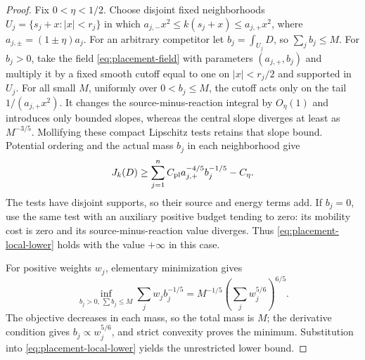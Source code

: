 \begin{proof}
Fix $0<\eta<1/2$. Choose disjoint fixed neighborhoods
$U_j=\{s_j+x:|x|<r_j\}$ in which
$a_{j,-}x^2\le k(s_j+x)\le a_{j,+}x^2$, where
$a_{j,\pm}=(1\pm\eta)a_j$. For an arbitrary competitor let
$b_j=\int_{U_j}D$, so $\sum_jb_j\le M$.
For $b_j>0$, take the field \eqref{eq:placement-field} with parameters
$(a_{j,+},b_j)$ and multiply it by a fixed smooth cutoff equal to one
on $|x|<r_j/2$ and supported in $U_j$.
For all small $M$, uniformly over $0<b_j\le M$, the cutoff acts
only on the tail $1/(a_{j,+}x^2)$. It changes the source-minus-reaction
integral by $O_{\eta}(1)$ and introduces only bounded slopes, whereas
the central slope diverges at least as $M^{-3/5}$.
Mollifying these compact Lipschitz tests retains that slope bound.
Potential ordering and the actual mass $b_j$ in each neighborhood give
\begin{equation}\label{eq:placement-local-lower}
 J_k(D)\ge
 \sum_{j=1}^n C_{\rm pl}a_{j,+}^{-4/5}b_j^{-1/5}-C_\eta.
\end{equation}
The tests have disjoint supports, so their source and energy terms
add. If $b_j=0$, use the same test with an auxiliary positive budget
tending to zero: its mobility cost is zero and its
source-minus-reaction value diverges. Thus \eqref{eq:placement-local-lower}
holds with the value $+\infty$ in this case.

For positive weights $w_j$, elementary minimization gives
\begin{equation}\label{eq:placement-mass-minimization}
 \inf_{b_j>0,\,\sum b_j\le M}\sum_j w_jb_j^{-1/5}
 =M^{-1/5}\left(\sum_jw_j^{5/6}\right)^{6/5}.
\end{equation}
The objective decreases in each mass, so the total mass is $M$;
the derivative condition gives $b_j\propto w_j^{5/6}$, and strict
convexity proves the minimum. Substitution into
\eqref{eq:placement-local-lower} yields the unrestricted lower bound.


\end{proof}
